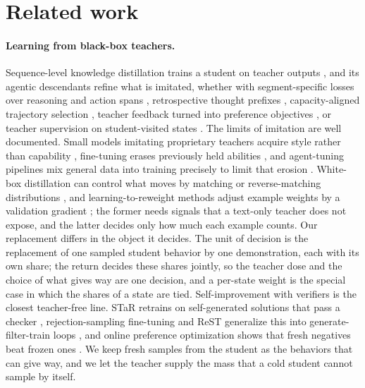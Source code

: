 \section{Related work}\label{sec:related}

\paragraph{Learning from black-box teachers.}
Sequence-level knowledge distillation trains a student on teacher
outputs \citep{kim2016sequence, mukherjee2023orca}, and its agentic
descendants refine what is imitated, whether with segment-specific
losses over reasoning and action spans \citep{liu2025structured},
retrospective thought prefixes \citep{kang2025distilling},
capacity-aligned trajectory selection \citep{tang2026smartad}, teacher
feedback turned into preference objectives \citep{tunstall2023zephyr,
pbsd2026}, or teacher supervision on student-visited states
\citep{ye2025bbopd}. The limits of imitation are well documented.
Small models imitating proprietary teachers acquire style rather than
capability \citep{gudibande2023false}, fine-tuning erases previously
held abilities \citep{luo2023empirical}, and agent-tuning pipelines
mix general data into training precisely to limit that erosion
\citep{zeng2023agenttuning}. White-box distillation can control what
moves by matching or reverse-matching distributions
\citep{agarwal2024gkd, gu2024minillm}, and learning-to-reweight
methods adjust example weights by a validation gradient
\citep{ren2018learning}; the former needs signals that a text-only
teacher does not expose, and the latter decides only how much each
example counts. Our replacement differs in the object it decides. The
unit of decision is the replacement of one sampled student behavior
by one demonstration, each with its own share; the return decides
these shares jointly, so the teacher dose and the choice of what gives
way are one decision, and a per-state weight is the special case in
which the shares of a state are tied. Self-improvement with verifiers is
the closest teacher-free line. STaR retrains on self-generated
solutions that pass a checker \citep{zelikman2022star},
rejection-sampling fine-tuning and ReST generalize this into
generate-filter-train loops \citep{yuan2023scaling, gulcehre2023rest,
singh2023beyond}, and online preference optimization shows that fresh
negatives beat frozen ones \citep{guo2024direct}. We keep fresh
samples from the student as the behaviors that can give way, and we
let the teacher supply the mass that a cold student cannot sample by
itself.

